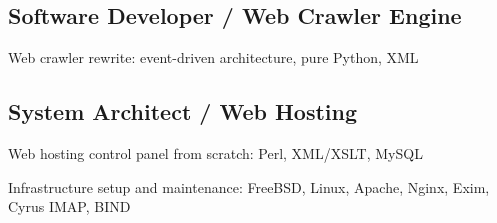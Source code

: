 \documentclass[letter,10pt]{article}
\begin{document}
\subsection{Software Developer / Web Crawler Engine}
\begin{zitemize}
\item Web crawler rewrite: event-driven architecture, pure Python, XML
\end{zitemize}

\subsection{System Architect / Web Hosting}
\begin{zitemize}
\item Web hosting control panel from scratch: Perl, XML/XSLT, MySQL
\item Infrastructure setup and maintenance: FreeBSD, Linux, Apache, Nginx, Exim, Cyrus IMAP, BIND
\end{zitemize}

%
%
\end{document}
